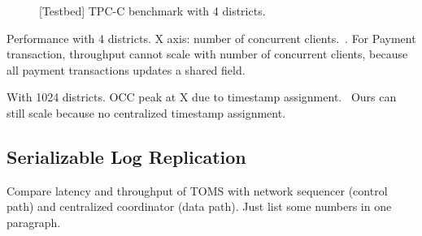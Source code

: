 \begin{figure}[t]
\centering
	\hspace{0.02\textwidth}
    \hspace{0.02\textwidth}
\caption{[Testbed] TPC-C benchmark with 4 districts.}
\label{fig:tpc-c}
\end{figure}

Performance with 4 districts. X axis: number of concurrent clients.~\cite{yu2014staring}. For Payment transaction, throughput cannot scale with number of concurrent clients, because all payment transactions updates a shared field.

With 1024 districts. OCC peak at X due to timestamp assignment.~\cite{yu2014staring} Ours can still scale because no centralized timestamp assignment.

\subsection{Serializable Log Replication}
\label{subsec:eval-replication}

Compare latency and throughput of TOMS with network sequencer (control path) and centralized coordinator (data path). Just list some numbers in one paragraph. 




